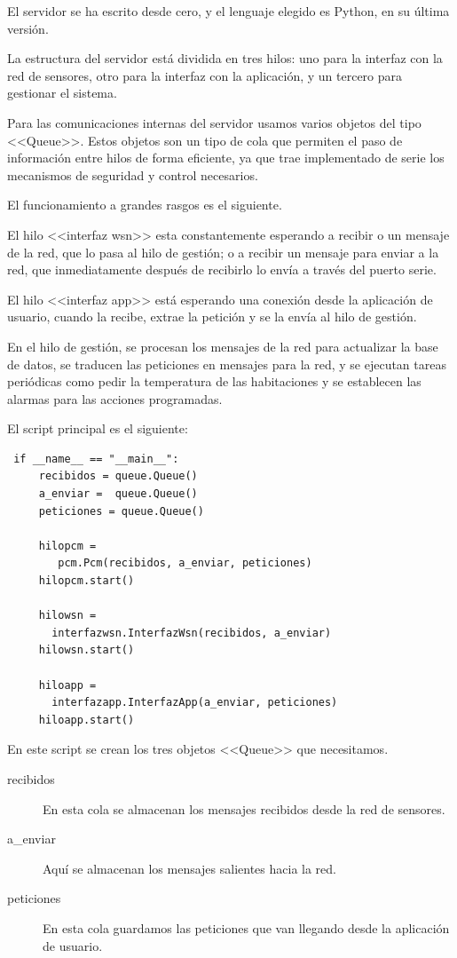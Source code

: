  El servidor se ha escrito desde cero, y el lenguaje elegido es Python, en su última versión. 
 
 La estructura del servidor está dividida en tres hilos: uno para la interfaz con la red de sensores, otro para la interfaz con la aplicación, y un tercero para gestionar el sistema. 
 
 
 Para las comunicaciones internas del servidor usamos varios objetos del tipo <<Queue>>. Estos objetos son un tipo de cola que permiten el paso de información entre hilos de forma eficiente, ya que trae implementado de serie los mecanismos de seguridad y control necesarios.
 
 El funcionamiento a grandes rasgos es el siguiente. 
 
 El hilo <<interfaz wsn>> esta constantemente esperando a recibir o un mensaje de la red, que lo pasa al hilo de gestión; o a recibir un mensaje para enviar a la red, que inmediatamente después de recibirlo lo envía a través del puerto serie.
 
 El hilo <<interfaz app>> está esperando una conexión desde la aplicación de usuario, cuando la recibe, extrae la petición y se la envía al hilo de gestión.
 
 En el hilo de gestión, se procesan los mensajes de la red para actualizar la base de datos, se traducen las peticiones en mensajes para la red, y se ejecutan tareas periódicas como pedir la temperatura de las habitaciones y se establecen las alarmas para las acciones programadas.
 
 El script principal es el siguiente:
 \begin{lstlisting}
 if __name__ == "__main__":
     recibidos = queue.Queue()
     a_enviar =  queue.Queue()
     peticiones = queue.Queue()
 
     hilopcm =
        pcm.Pcm(recibidos, a_enviar, peticiones)
     hilopcm.start()
 
     hilowsn = 
       interfazwsn.InterfazWsn(recibidos, a_enviar)
     hilowsn.start()
 
     hiloapp = 
       interfazapp.InterfazApp(a_enviar, peticiones)
     hiloapp.start()
 \end{lstlisting}
 
 En este script se crean los tres objetos <<Queue>> que necesitamos.
 \begin{description}
     \item[recibidos] En esta cola se almacenan los mensajes recibidos desde la red de sensores.
     \item[a\_enviar] Aquí se almacenan los mensajes salientes hacia la red.
     \item[peticiones] En esta cola guardamos las peticiones que van llegando desde la aplicación de usuario.
    \end{description}
 

